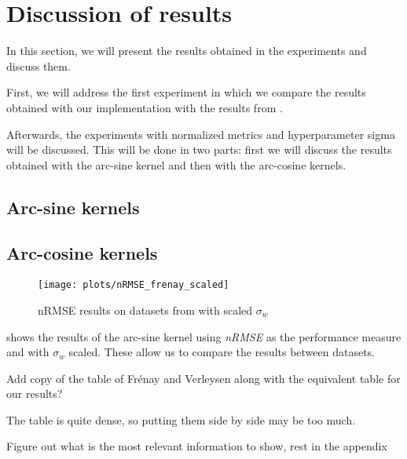 \chapter{Discussion of results}
\label{sec:analysis}

In this section, we will present the results obtained in the experiments
and discuss them.

First, we will address the first experiment in which we compare the results
obtained with our implementation with the results from
\textcite{frenayParameterinsensitiveKernelExtreme2011}.

Afterwards, the experiments with normalized metrics and hyperparameter sigma
will be discussed. This will be done in two parts: first we will discuss the
results obtained with the arc-sine kernel and then with the arc-cosine kernels.



\pagebreak
\section{Arc-sine kernels}



\pagebreak
\section{Arc-cosine kernels}




\begin{figure}[H]
    \texttt{[image: plots/nRMSE\_frenay\_scaled]}
    \caption{nRMSE results on datasets from \cite{frenayParameterinsensitiveKernelExtreme2011} with
        scaled $\sigma_w$}%
    \label{fig:nrmse-frenay-scaled}
\end{figure}

 shows the results of the arc-sine kernel using
\emph{nRMSE} as the performance measure and with $\sigma_w$ scaled. These allow
us to compare the results between datasets.

\begin{cnote}
    Add copy of the table of Frénay and Verleysen along with the equivalent
    table for our results?

    The table is quite dense, so putting them side by side may be too much.

    Figure out what is the most relevant information to show, rest in the
    appendix
\end{cnote}

